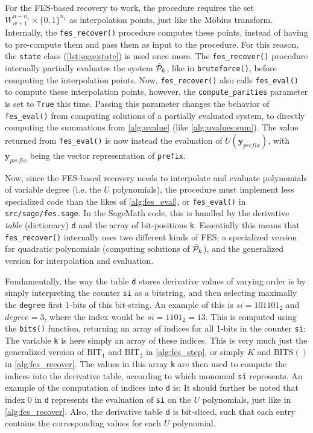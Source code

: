 For the FES-based recovery to work, the procedure requires the set $W^{n - n_1}_{w + 1} \times \{0,1\}^{n_1}$ as interpolation points, just like the Möbius transform. Internally, the \texttt{fes\_recover()} procedure computes these points, instead of having to pre-compute them and pass them as input to the procedure. For this reason, the \texttt{state} class (\cref{lst:sage:state}) is used once more. The \texttt{fes\_recover()} procedure internally partially evaluates the system $\Tilde{\mathcal{P}}_k$, like in \texttt{bruteforce()}, before computing the interpolation points. Now, \texttt{fes\_recover()} also calls \texttt{fes\_eval()} to compute these interpolation points, however, the \texttt{compute\_parities} parameter is set to \texttt{True} this time. Passing this parameter changes the behavior of \texttt{fes\_eval()} from computing solutions of a partially evaluated system, to directly computing the summations from \cref{alg:uvalue} (like \cref{alg:uvalues:sum}). The value returned from \texttt{fes\_eval()} is now instead the evaluation of $U(\mathbf{y}_{prefix})$, with $\mathbf{y}_{prefix}$ being the vector representation of \texttt{prefix}.

Now, since the FES-based recovery needs to interpolate and evaluate polynomials of variable degree (i.e. the $U$ polynomials), the procedure must implement less specialized code than the likes of \cref{alg:fes_eval}, or \texttt{fes\_eval()} in \texttt{src/sage/fes.sage}. In the SageMath code, this is handled by the derivative \textit{table} (dictionary) \texttt{d} and the array of bit-positions \texttt{k}. Essentially this means that \texttt{fes\_recover()} internally uses two different kinds of FES; a specialized version for quadratic polynomials (computing solutions of $\Tilde{\mathcal{P}}_k$), and the generalized version for interpolation and evaluation.

Fundamentally, the way the table \texttt{d} stores derivative values of varying order is by simply interpreting the counter \texttt{si} as a bitstring, and then selecting maximally the \texttt{degree} first 1-bits of this bit-string. An example of this is $si = 101101_2$ and $degree = 3$, where the index would be $si = 1101_2 = 13$. This is computed using the \texttt{bits()} function, returning an array of indices for all 1-bits in the counter \texttt{si}:
The variable \texttt{k} is here simply an array of these indices. This is very much just the generalized version of $\text{BIT}_1$ and $\text{BIT}_2$ in \cref{alg:fes_step}, or simply $K$ and $\text{BITS}()$ in \cref{alg:fes_recover}. The values in this array \texttt{k} are then used to compute the indices into the derivative table, according to which monomial \texttt{si} represents. An example of the computation of indices into \texttt{d} is:
It should further be noted that index $0$ in \texttt{d} represents the evaluation of \texttt{si} on the $U$ polynomials, just like in \cref{alg:fes_recover}. Also, the derivative table \texttt{d} is bit-sliced, such that each entry contains the corresponding values for each $U$ polynomial.

